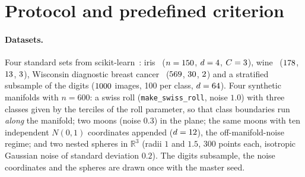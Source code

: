 \documentclass[10pt,a4paper]{article}
\theoremstyle{plain}
\theoremstyle{definition}
\theoremstyle{remark}
\newcommand{\R}{\mathbb{R}}
\begin{document}
\section{Protocol and predefined criterion}\label{sec:protocol}

\paragraph{Datasets.} Four standard sets from scikit-learn~\citep{pedregosa2011}: iris~\citep{fisher1936} ($n=150$, $d=4$, $C=3$), wine~\citep{aeberhardforina1991,uci} ($178$, $13$, $3$), Wisconsin diagnostic breast cancer~\citep{street1993} ($569$, $30$, $2$) and a stratified subsample of the digits ($1000$ images, 100 per class, $d=64$). Four synthetic manifolds with $n=600$: a swiss roll (\texttt{make\_swiss\_roll}, noise $1.0$) with three classes given by the terciles of the roll parameter, so that class boundaries run \emph{along} the manifold; two moons (noise $0.3$) in the plane; the same moons with ten independent $N(0,1)$ coordinates appended ($d=12$), the off-manifold-noise regime; and two nested spheres in $\R^3$ (radii $1$ and $1.5$, 300 points each, isotropic Gaussian noise of standard deviation $0.2$). The digits subsample, the noise coordinates and the spheres are drawn once with the master seed.
\end{document}
